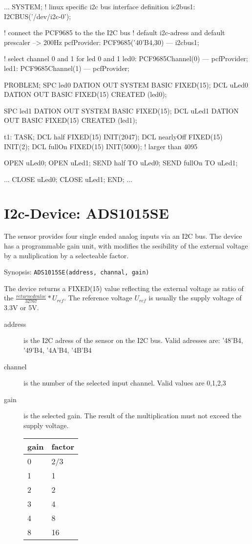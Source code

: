 \begin{PEARLCode}
...
SYSTEM;
   ! linux specific i2c bus interface definition
   ic2bus1: I2CBUS('/dev/i2c-0');

   ! connect the PCF9685 to the the I2C bus
   ! default i2c-adress and default prescaler --> 200Hz
   pcfProvider: PCF9685('40'B4,30) --- i2cbus1;

   ! select channel 0 and 1 for led 0 and 1
   led0: PCF9685Channel(0) --- pcfProvider;
   led1: PCF9685Channel(1) --- pcfProvider;


PROBLEM;
   SPC led0 DATION OUT SYSTEM BASIC FIXED(15);
   DCL uLed0 DATION OUT BASIC FIXED(15) CREATED (led0);

   SPC led1 DATION OUT SYSTEM BASIC FIXED(15);
   DCL uLed1 DATION OUT BASIC FIXED(15) CREATED (led1);

t1: TASK;
   DCL half FIXED(15) INIT(2047);
   DCL nearlyOff FIXED(15) INIT(2);
   DCL fullOn FIXED(15) INIT(5000); ! larger than 4095

   OPEN uLed0;
   OPEN uLed1;
   SEND half   TO uLed0;  
   SEND fullOn TO uLed1;  

...
   CLOSE uLed0;
   CLOSE uLed1;
END;
...
\end{PEARLCode}

\section{I2c-Device: ADS1015SE}
The sensor provides four single ended analog inputs via an I2C bus.
The device  has a programmable gain unit, with modifies the sesibility
of the external voltage by a muliplication by a selecteable factor.

Synopsis: \texttt{ADS1015SE(address, channal, gain)}

The device returns a FIXED(15) value reflecting the external voltage as ratio
of the $\frac{returned value}{32767}*U_{ref}$.
The reference voltage $U_{ref}$ is usually the supply voltage of 3.3V or 5V.

\begin{description}
\item[address] is the I2C adress of the sensor on the I2C bus.
   Valid adresses are: '48'B4, '49'B4, '4A'B4, '4B'B4
\item[channel] is the number of the selected input channel. 
   Valid values are 0,1,2,3
\item[gain] is the selected gain.
   The result of the multiplication must not exceed the supply voltage.

  \begin{tabular}{l|l}
   gain & factor\\
   \hline 
   0 & 2/3 \\
   1 & 1 \\
   2 & 2 \\
   3 & 4 \\
   4 & 8 \\
   8 & 16 \\
   \end{tabular} 

\end{description}

